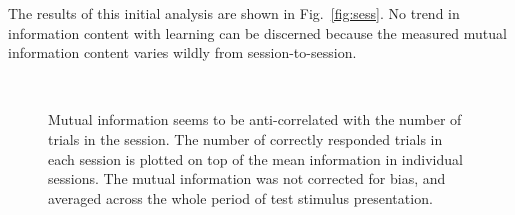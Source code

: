 The results of this initial analysis are shown in Fig.~\ref{fig:sess}.
No trend in information content with learning can be discerned because the measured mutual information content varies wildly from session-to-session.



%
%
% 
% 
\begin{figure}[htbp]
    \\
    \caption{Mutual information seems to be anti-correlated with the number of trials in the session. The number of correctly responded trials in each session is plotted on top of the mean information in individual sessions. The mutual information was not corrected for bias, and averaged across the whole period of test stimulus presentation.
}
    \label{fig:IandN}
\end{figure}


